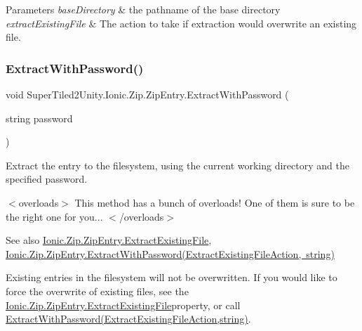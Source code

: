 \begin{DoxyParams}{Parameters}
{\em base\+Directory} & the pathname of the base directory\\
\hline
{\em extract\+Existing\+File} & The action to take if extraction would overwrite an existing file. \\
\hline
\end{DoxyParams}
\mbox{\label{class_super_tiled2_unity_1_1_ionic_1_1_zip_1_1_zip_entry_a346d1d4eaf4ccb1274fe31629f3cb429}} 
\subsubsection{\texorpdfstring{Extract\+With\+Password()}{ExtractWithPassword()}\hspace{0.1cm}{\footnotesize\ttfamily [1/5]}}
{\footnotesize\ttfamily void Super\+Tiled2\+Unity.\+Ionic.\+Zip.\+Zip\+Entry.\+Extract\+With\+Password (\begin{DoxyParamCaption}\item[{string}]{password }\end{DoxyParamCaption})}



Extract the entry to the filesystem, using the current working directory and the specified password. 

$<$overloads$>$ This method has a bunch of overloads! One of them is sure to be the right one for you... $<$/overloads$>$

\begin{DoxySeeAlso}{See also}
\mbox{\hyperlink{class_super_tiled2_unity_1_1_ionic_1_1_zip_1_1_zip_entry_ad1ab903c29b91edb82e7c6a9768552dd}{Ionic.\+Zip.\+Zip\+Entry.\+Extract\+Existing\+File}}, \mbox{\hyperlink{class_super_tiled2_unity_1_1_ionic_1_1_zip_1_1_zip_entry_a99571d1031642000580642b2a3028394}{Ionic.\+Zip.\+Zip\+Entry.\+Extract\+With\+Password(\+Extract\+Existing\+File\+Action, string)}}


\end{DoxySeeAlso}


Existing entries in the filesystem will not be overwritten. If you would like to force the overwrite of existing files, see the \mbox{\hyperlink{class_super_tiled2_unity_1_1_ionic_1_1_zip_1_1_zip_entry_ad1ab903c29b91edb82e7c6a9768552dd}{Ionic.\+Zip.\+Zip\+Entry.\+Extract\+Existing\+File}}property, or call \mbox{\hyperlink{class_super_tiled2_unity_1_1_ionic_1_1_zip_1_1_zip_entry_a99571d1031642000580642b2a3028394}{Extract\+With\+Password(\+Extract\+Existing\+File\+Action,string)}}. 

